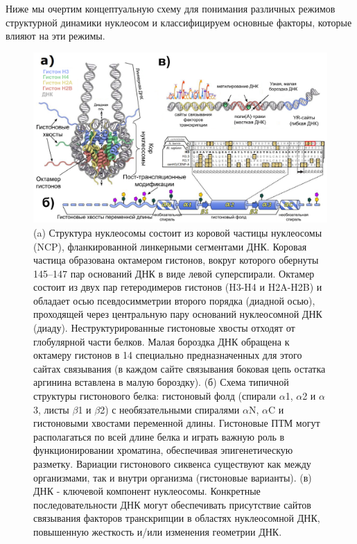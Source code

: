     Ниже мы очертим концептуальную схему для понимания различных режимов структурной динамики нуклеосом и классифицируем основные факторы, которые влияют на эти режимы. 

\begin{figure} [H]
    \centering
    \includegraphics [width=\textwidth]{images/p2/cosb/part2_1_f1.pdf}
    \caption[Структура и вариабельность нуклеосомы]{(a) Структура нуклеосомы состоит из коровой частицы нуклеосомы (NCP), фланкированной линкерными сегментами ДНК. Коровая частица образована октамером гистонов, вокруг которого обернуты 145–147 пар оснований ДНК в виде левой суперспирали. Октамер состоит из двух пар гетеродимеров гистонов (H3-H4 и H2A-H2B) и обладает осью псевдосимметрии второго порядка (диадной осью), проходящей через центральную пару оснований нуклеосомной ДНК (диаду). Неструктурированные гистоновые хвосты отходят от глобулярной части белков. Малая бороздка ДНК обращена к октамеру гистонов в 14 специально предназначенных для этого сайтах связывания (в каждом сайте связывания боковая цепь остатка аргинина вставлена в малую бороздку). 
    (б) Схема типичной структуры гистонового белка: гистоновый фолд (спирали $\alpha$1, $\alpha$2 и $\alpha$3, листы $\beta$1 и $\beta$2) с необязательными спиралями $\alpha$N, $\alpha$C и гистоновыми хвостами переменной длины. Гистоновые ПТМ могут располагаться по всей длине белка и играть важную роль в функционировании хроматина, обеспечивая эпигенетическую разметку. Вариации гистонового сиквенса существуют как между организмами, так и внутри организма (гистоновые варианты).
    (в) ДНК - ключевой компонент нуклеосомы. Конкретные последовательности ДНК могут обеспечивать присутствие сайтов связывания факторов транскрипции в областях нуклеосомной ДНК, повышенную жесткость и/или изменения геометрии ДНК.}
    \label{fig:part2_1_f1}
\end{figure}



